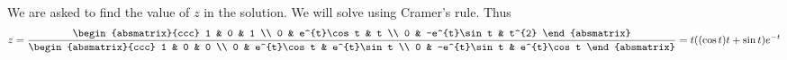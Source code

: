 \begin{solution}
  We are asked to find the value of $z$ in the solution. We will solve
  using Cramer's rule.  Thus
  \begin{equation*}
    z=\vspace{.05in} \frac{\begin{absmatrix}{ccc}
        1 & 0 & 1 \\
        0 & e^{t}\cos t & t \\
        0 & -e^{t}\sin t & t^{2}
      \end{absmatrix} }{\begin{absmatrix}{ccc}
        1 & 0 & 0 \\
        0 & e^{t}\cos t & e^{t}\sin t \\
        0 & -e^{t}\sin t & e^{t}\cos t
      \end{absmatrix} }=\allowbreak t((\cos t) t+\sin t) e^{-t}
  \end{equation*}
\end{solution}
